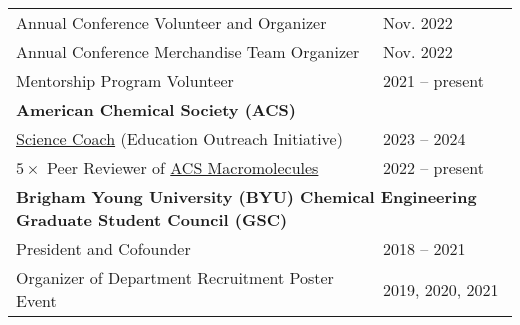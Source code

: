 \documentclass[letterpaper,11pt]{article}
\begin{document}
\begin{longtable}{@{}p{}l@{}}
  \hspace{3mm} Annual Conference Volunteer and Organizer                                                                                                                                                          & Nov. 2022        \\
  \hspace{3mm} Annual Conference Merchandise Team Organizer                                                                                                                                                       & Nov. 2022        \\
  \hspace{3mm} Mentorship Program Volunteer                                                                                                                                                                       & 2021 -- present  \\ [4pt]
  \multicolumn{2}{l}{\hspace{-3mm} \bf{American Chemical Society (ACS)}}                                                                                                                                                             \\
  \hspace{3mm} \href{https://www.acs.org/education/outreach/science-coaches.html}{Science Coach} (Education Outreach Initiative)                                                                                  & 2023 -- 2024     \\
  \hspace{3mm} $5\times$ Peer Reviewer of \href{https://pubs.acs.org/journal/mamobx}{ACS Macromolecules}                                                                                                          & 2022 -- present  \\ [4pt]
  \multicolumn{2}{l}{\hspace{-3mm} \bf{Brigham Young University (BYU) Chemical Engineering Graduate Student Council (GSC)}}                                                                                                          \\
  \hspace{3mm} President and Cofounder                                                                                                                                                                            & 2018 -- 2021     \\
  \hspace{3mm} Organizer of Department Recruitment Poster Event                                                                                                                                                   & 2019, 2020, 2021 \\

\end{longtable}
\end{document}
